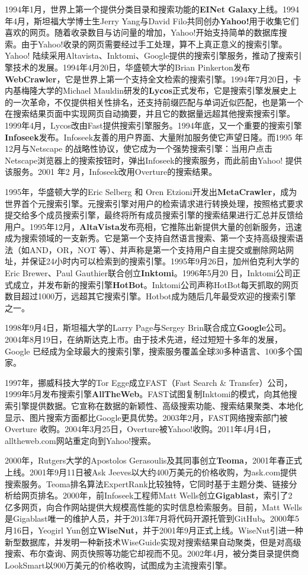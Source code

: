 1994年1月，世界上第一个提供分类目录和搜索功能的\textbf{EINet Galaxy}上线。1994年4月，斯坦福大学博士生Jerry Yang与David Filo共同创办\textbf{Yahoo!}用于收集它们喜欢的网页。随着收录数目与访问量的增加，Yahoo!开始支持简单的数据库搜索。由于Yahoo!收录的网页需要经过手工处理，算不上真正意义的搜索引擎。Yahoo! 陆续采用Altavista、Inktomi、Google提供的搜索引擎服务，推动了搜索引擎技术的发展。1994年4月20日，华盛顿大学的Brian Pinkerton发布
\textbf{WebCrawler}，它是世界上第一个支持全文检索的搜索引擎。1994年7月20日，卡内基梅隆大学的Michael Mauldin研发的\textbf{Lycos}正式发布，它是搜索引擎发展史上的一次革命，不仅提供相关性排名，还支持前缀匹配与单词近似匹配，也是第一个在搜索结果页面中实现网页自动摘要，并且它的数据量远超其他搜索搜索引擎。1999年4月，Lycos改由Fast提供搜索引擎服务。1994年底，又一个重要的搜索引擎\textbf{Infoseek}发布。Infoseek友善的用户界面、大量附加服务使它声望日隆。而1995 年12月与Netscape 的战略性协议，使它成为一个强势搜索引擎：当用户点击Netscape浏览器上的搜索按钮时，弹出Infoseek的搜索服务，而此前由Yahoo! 提供该服务。2001 年2 月，Infoseek改用Overture的搜索结果。

1995年，华盛顿大学的Eric Selberg 和 Oren Etzioni开发出\textbf{MetaCrawler}，成为世界首个元搜索引擎。元搜索引擎对用户的检索请求进行转换处理，按照格式要求提交给多个成员搜索引擎，最终将所有成员搜索引擎的搜索结果进行汇总并反馈给用户。1995年12月，\textbf{AltaVista}发布亮相，它推陈出新提供大量的创新服务，迅速成为搜索领域的一支新秀。它是第一个支持自然语言搜索、第一个支持高级搜索语法（如AND，OR，NOT 等）、并声称是第一个支持用户自主提交或删除网站网址，并保证24小时内可以检索到的搜索引擎。1995年9月26日，加州伯克利大学的Eric Brewer、Paul Gauthier联合创立\textbf{Inktomi}。1996年5月20 日，Inktomi公司正式成立，并发布新的搜索引擎\textbf{HotBot}。Inktomi公司声称HotBot每天抓取的网页数目超过1000万，远超其它搜索引擎。Hotbot成为随后几年最受欢迎的搜索引擎之一。

1998年9月4日，斯坦福大学的Larry Page与Sergey Brin联合成立\textbf{Google}公司。2004年8月19日，在纳斯达克上市。由于技术先进，经过短短十多年的发展，Google 已经成为全球最大的搜索引擎，搜索服务覆盖全球30多种语言、100多个国家。

1997年，挪威科技大学的Tor Egge成立FAST（Fast Search \& Transfer）公司，1999年5月发布搜索引擎\textbf{AllTheWeb}。FAST试图复制Inktomi的模式，向其他搜索引擎提供数据。它宣称在数据的新颖性、高级搜索功能、搜索结果聚类、本地化显示、图片搜索方面都比Google更具优势。2003年2月，FAST网络搜索部门被Overture 收购。2004年3月25日，Overture被Yahoo!收购。2011年4月4日，alltheweb.com网站重定向到Yahoo!搜索。

2000年，Rutgers大学的Apostolos Gerasoulis及其同事创立\textbf{Teoma}，2001年春正式上线。2001年9月11日被Ask Jeeves以大约400万美元的价格收购，为ask.com提供搜索服务。Teoma排名算法ExpertRank比较独特，它同时基于主题分类、链接分析给网页排名。2000年，前Infoseek工程师Matt Wells创立\textbf{Gigablast}，索引了2 亿多网页，向合作网站提供大规模高性能的实时信息检索服务。目前，Matt Wells是Gigablast唯一的维护人员，并于2013年7月将代码开源托管到GitHub。2000年5月16日，Yeogirl Yun创立\textbf{WiseNut}，并于2001年9月正式上线。WiseNut引进一种新型数据库，并发明一种新技术WiseGuide实现对搜索结果自动聚类，但是对高级搜索、布尔查询、网页快照等功能它却视而不见。2002年4月，被分类目录提供商LookSmart以900万美元的价格收购，试图成为主流搜索引擎。

